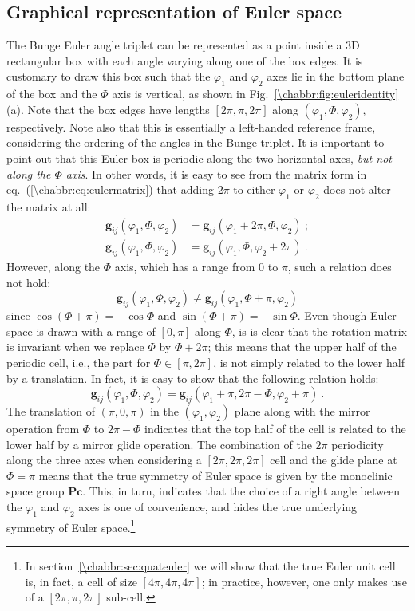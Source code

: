 \subsection{Graphical representation of Euler space}\label{\chabbr:sec:eulerspace}
The Bunge Euler angle triplet can be represented as a point inside a 3D rectangular box with each angle varying along one of the box edges. It is customary to draw this box such that the $\varphi_1$ and $\varphi_2$ axes lie in the bottom plane of the box and the $\Phi$ axis is vertical, as shown in Fig.~\ref{\chabbr:fig:euleridentity}(a). Note that the box edges have lengths $[2\pi, \pi, 2\pi]$ along $(\varphi_1,\Phi,\varphi_2)$, respectively. Note also that this is essentially a left-handed reference frame, considering the ordering of the angles in the Bunge triplet.  It is important to point out that this Euler box is periodic along the two horizontal axes, \textit{but not along the $\Phi$ axis}.  In other words, it is easy to see from the matrix form in eq.~(\ref{\chabbr:eq:eulermatrix}) that adding $2\pi$ to either $\varphi_1$ or $\varphi_2$ does not alter the matrix at all:
\begin{align*}
	\mathbf{g}_{ij}(\varphi_1,\Phi,\varphi_2) &=\mathbf{g}_{ij}(\varphi_1+2\pi,\Phi,\varphi_2)\ ;\\
	\mathbf{g}_{ij}(\varphi_1,\Phi,\varphi_2) &=\mathbf{g}_{ij}(\varphi_1,\Phi,\varphi_2+2\pi)\ .
\end{align*}
However, along the $\Phi$ axis, which has a range from $0$ to $\pi$, such a relation does not hold:
\[
	\mathbf{g}_{ij}(\varphi_1,\Phi,\varphi_2) \ne \mathbf{g}_{ij}(\varphi_1,\Phi+\pi,\varphi_2)
\]
since $\cos(\Phi+\pi)=-\cos\Phi$ and $\sin(\Phi+\pi)=-\sin\Phi$.  Even though Euler space is drawn with a range of $[0,\pi]$ along $\Phi$, is is clear that the rotation matrix is invariant when we replace $\Phi$ by $\Phi+2\pi$; this means that the upper half of the periodic cell, i.e., the part for $\Phi\in[\pi,2\pi]$, is not simply related to the lower half by a translation.  In fact, it is easy to show that the following relation holds:
\begin{equation}
	\mathbf{g}_{ij}(\varphi_1,\Phi,\varphi_2) = \mathbf{g}_{ij}(\varphi_1+\pi,2\pi-\Phi,\varphi_2+\pi)\ .\label{\chabbr:eq:eulerglide}
\end{equation}
The translation of $(\pi,0,\pi)$ in the $(\varphi_1,\varphi_2)$ plane along with the mirror operation from $\Phi$ to $2\pi-\Phi$ indicates that the top half of the cell is related to the lower half by a mirror glide operation. The combination of the $2\pi$ periodicity along the three axes when considering a $[2\pi,2\pi,2\pi]$ cell and the glide plane at $\Phi=\pi$ means that the true symmetry of Euler space is given by the monoclinic space group $\mathbf{Pc}$.   This, in turn, indicates that the choice of a right angle between the $\varphi_1$ and $\varphi_2$ axes is one of convenience, and hides the true underlying symmetry of Euler space.\footnote{In section~\ref{\chabbr:sec:quateuler} we will show that the true Euler unit cell is, in fact, a cell of size $[4\pi, 4\pi, 4\pi]$; in practice, however, one only makes use of a $[2\pi,\pi,2\pi]$ sub-cell.}

